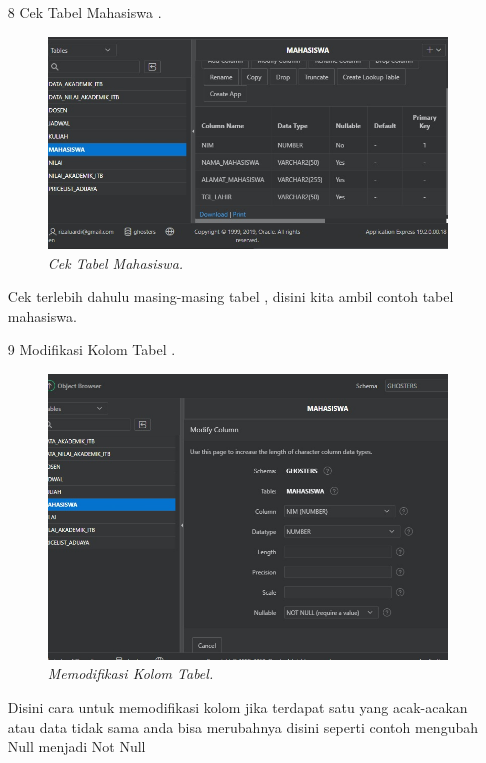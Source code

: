 \begin{enumerate}
\item[8]Cek Tabel Mahasiswa .
\begin{figure}[!htbp]
    \begin{center}
    \includegraphics[scale=0.5]{figures/7.jpg}
    \caption{\textit{Cek Tabel Mahasiswa.}}
    \end{center}
\end{figure}
\par Cek terlebih dahulu masing-masing tabel , disini kita ambil contoh tabel mahasiswa.

\item[9]Modifikasi Kolom Tabel .
\begin{figure}[!htbp]
    \begin{center}
    \includegraphics[scale=0.45]{figures/modif_column.jpg}
    \caption{\textit{Memodifikasi Kolom Tabel.}}
    \end{center}
\end{figure}
\par Disini cara untuk memodifikasi kolom jika terdapat satu yang acak-acakan atau data tidak sama anda bisa merubahnya disini seperti contoh mengubah Null menjadi Not Null


\end{enumerate}
